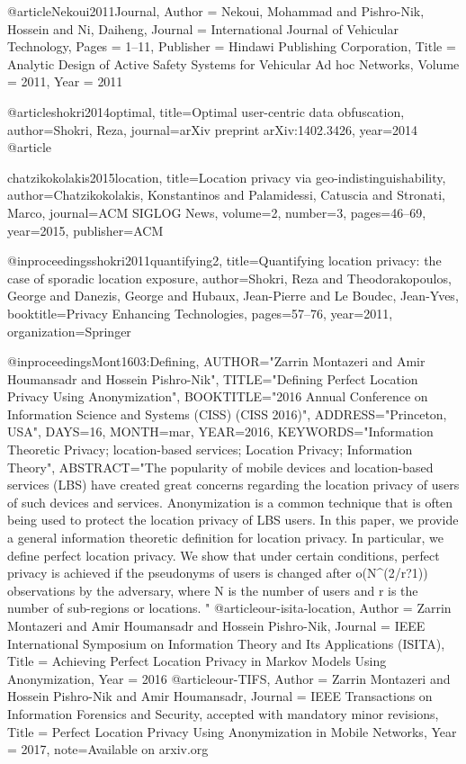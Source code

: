 {{{{{{{	
	
	
	
	
	
	
	
	@article{Nekoui2011Journal,
	Author = {Nekoui, Mohammad and Pishro-Nik, Hossein and Ni, Daiheng},
	Journal = {International Journal of Vehicular Technology},
	Pages = {1--11},
	Publisher = {Hindawi Publishing Corporation},
	Title = {Analytic Design of Active Safety Systems for Vehicular Ad hoc Networks},
	Volume = {2011},
	Year = {2011}}
	
	
	
	
	
	
	@article{shokri2014optimal,
	title={Optimal user-centric data obfuscation},
	author={Shokri, Reza},
	journal={arXiv preprint arXiv:1402.3426},
	year={2014}
	}
	@article{chatzikokolakis2015location,
	title={Location privacy via geo-indistinguishability},
	author={Chatzikokolakis, Konstantinos and Palamidessi, Catuscia and Stronati, Marco},
	journal={ACM SIGLOG News},
	volume={2},
	number={3},
	pages={46--69},
	year={2015},
	publisher={ACM}
	
	}
	@inproceedings{shokri2011quantifying2,
	title={Quantifying location privacy: the case of sporadic location exposure},
	author={Shokri, Reza and Theodorakopoulos, George and Danezis, George and Hubaux, Jean-Pierre and Le Boudec, Jean-Yves},
	booktitle={Privacy Enhancing Technologies},
	pages={57--76},
	year={2011},
	organization={Springer}
	}
	
	
	@inproceedings{Mont1603:Defining,
	AUTHOR="Zarrin Montazeri and Amir Houmansadr and Hossein Pishro-Nik",
	TITLE="Defining Perfect Location Privacy Using Anonymization",
	BOOKTITLE="2016 Annual Conference on Information Science and Systems (CISS) (CISS
	2016)",
	ADDRESS="Princeton, USA",
	DAYS=16,
	MONTH=mar,
	YEAR=2016,
	KEYWORDS="Information Theoretic Privacy; location-based services; Location Privacy;
	Information Theory",
	ABSTRACT="The popularity of mobile devices and location-based services (LBS) have
	created great concerns regarding the location privacy of users of such
	devices and services. Anonymization is a common technique that is often
	being used to protect the location privacy of LBS users. In this paper, we
	provide a general information theoretic definition for location privacy. In
	particular, we define perfect location privacy. We show that under certain
	conditions, perfect privacy is achieved if the pseudonyms of users is
	changed after o(N^(2/r?1)) observations by the adversary, where N is the
	number of users and r is the number of sub-regions or locations.
	"
	}
	@article{our-isita-location,
	Author = {Zarrin Montazeri and Amir Houmansadr and Hossein Pishro-Nik},
	Journal = {IEEE International Symposium on Information Theory and Its Applications (ISITA)},
	Title = {Achieving Perfect Location Privacy in Markov Models Using Anonymization},
	Year = {2016}
	}
	@article{our-TIFS,
	Author = {Zarrin Montazeri and Hossein Pishro-Nik and Amir Houmansadr},
	Journal = {IEEE Transactions on Information Forensics and Security, accepted with mandatory minor revisions},
	Title = {Perfect Location Privacy Using Anonymization in Mobile Networks},
	Year = {2017},
	note={Available on arxiv.org}
	}
	
}}}}}}}
